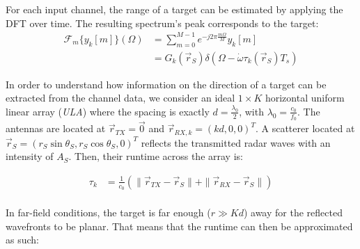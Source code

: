 For each input channel, the range of a target can be estimated by applying the DFT over time.
The resulting spectrum's peak corresponds to the target:
\begin{align}
    \mathcal{F}_m\{y_k[m]\}(\Omega) & = \sum_{m=0}^{M-1} e^{-j2\pi\frac{m\Omega}{M}} y_k[m]                            \\
                                    & = G_k(\vec r_S) \delta(\Omega-\dot \omega \tau_k(\vec r_S)T_s) \label{eqn:y_fft}
\end{align}


In order to understand how information on the direction of a target can be extracted from the channel data,
we consider an ideal $1 \times K$ horizontal uniform linear array (\textit{ULA}) where the spacing is exactly $d=\frac{\lambda_0}{2}$, with $\lambda_0 = \frac{c_0}{f_0}$.
The antennas are located at $\vec r_{TX}= \vec 0$ and $\vec r_{RX,k}=(kd,0,0)^T$.
A scatterer located at  $\vec r_S = (r_S\sin\theta_S, r_{S}\cos\theta_S , 0)^T$  reflects the transmitted radar waves with an intensity of $A_S$.
Then, their runtime across the array is:

\begin{align}
    \tau_k & =\frac{1}{c_0} \left( \| \vec r_{TX} - \vec r_S \|+\| \vec r_{RX} - \vec r_S \| \right) \\
\end{align}

In far-field conditions, the target is far enough ($r \gg K d$) away for the reflected wavefronts to be planar.
That means that the runtime can then be approximated as such:

